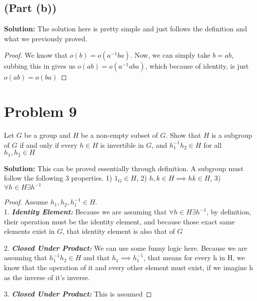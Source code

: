 \documentclass{article}
\begin{document}
\subsection{(Part (b))}
\noindent \textbf{Solution:} 
The solution here is pretty simple and just follows the definition and what we previously proved.
\begin{proof}
We know that $o(b)=o(a^{-1}ba)$. Now, we can simply take $b=ab$, subbing this in gives us $o(ab)=o(a^{-1}aba)$, which because of identity, is just $o(ab)=o(ba)$
\end{proof}

\section{Problem 9}
Let $G$ be a group and $H$ be a non-empty subset of $G$. Show that $H$ is a subgroup of $G$ if and only if every $h \in H$ is invertible in $G$, and $h_1^{-1}h_2 \in H$ for all $h_1, h_2 \in H$

\noindent \textbf{Solution:} 
This can be proved essentially through definition. A subgroup must follow the following 3 properties. 1) $1_G \in H$, 2) $h, k \in H \implies hk \in H$, 3) $\forall h \in H \exists h^{-1}$
\begin{proof}
Assume $h_1, h_2, h_1^{-1} \in H$.\\
1. \textbf{\textit{Identity Element:}} Because we are assuming that $\forall h \in H \exists h^{-1}$, by definition, their operation must be the identity element, and because those exact same elements exist in $G$, that identity element is also that of $G$

2. \textbf{\textit{Closed Under Product:}} We can use some funny logic here. Because we are assuming that $h_1^{-1}h_2 \in H$ and that $h_1 \implies h_1^{-1}$, that means for every h in H, we know that the operation of it and every other element must exist, if we imagine h as the inverse of it's inverse.

3. \textbf{\textit{Closed Under Product:}} This is assumed

\end{proof}
\end{document}
